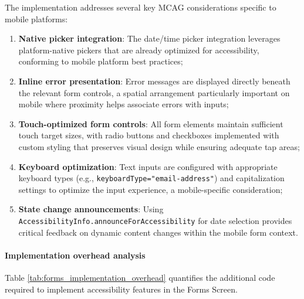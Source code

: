 The implementation addresses several key MCAG considerations specific to mobile platforms:
\begin{enumerate}
    \item \textbf{Native picker integration}: The date/time picker integration leverages platform-native pickers that are already optimized for accessibility, conforming to mobile platform best practices;
    
    \item \textbf{Inline error presentation}: Error messages are displayed directly beneath the relevant form controls, a spatial arrangement particularly important on mobile where proximity helps associate errors with inputs;
    
    \item \textbf{Touch-optimized form controls}: All form elements maintain sufficient touch target sizes, with radio buttons and checkboxes implemented with custom styling that preserves visual design while ensuring adequate tap areas;
    
    \item \textbf{Keyboard optimization}: Text inputs are configured with appropriate keyboard types (e.g., \texttt{keyboardType="email-address"}) and capitalization settings to optimize the input experience, a mobile-specific consideration;
    
    \item \textbf{State change announcements}: Using \texttt{AccessibilityInfo.announceForAccessibility} for date selection provides critical feedback on dynamic content changes within the mobile form context.
\end{enumerate}

\paragraph{Implementation overhead analysis}

Table \ref{tab:forms_implementation_overhead} quantifies the additional code required to implement accessibility features in the Forms Screen.


